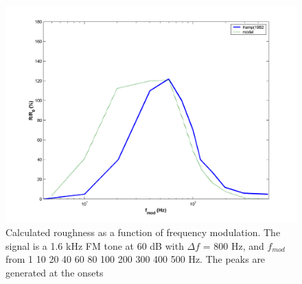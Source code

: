 \begin{enumerate}
    \begin{figure}[p]
        \centering
        \includegraphics[width=\IPEMDefaultFigureWidth]{Graphics/RoughnessExperimentsKemp1}
        \caption{Calculated roughness as a function of frequency modulation. The signal is
        a 1.6 kHz FM tone at 60 dB with $\Delta f$ = 800 Hz, and $f_{mod}$
        from 1 10 20 40 60 80 100 200 300 400 500 Hz. The peaks are
        generated at the onsets}
        \label{Fig:RoughnessExperimentsKemp1}
    \end{figure}


\end{enumerate}
